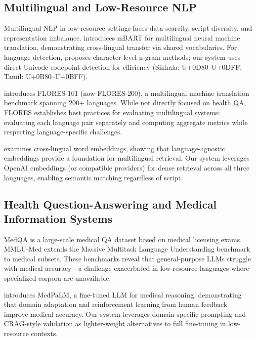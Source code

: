 \documentclass[11pt,a4paper]{article}
\begin{document}
\subsection{Multilingual and Low-Resource NLP}

Multilingual NLP in low-resource settings faces data scarcity, script diversity, and representation imbalance. \cite{lewis2019mbart} introduces mBART for multilingual neural machine translation, demonstrating cross-lingual transfer via shared vocabularies. For language detection, \cite{dunning1994statistical} proposes character-level n-gram methods; our system uses direct Unicode codepoint detection for efficiency (Sinhala: U+0D80--U+0DFF, Tamil: U+0B80--U+0BFF).

\cite{flores2021evaluation} introduces FLORES-101 (now FLORES-200), a multilingual machine translation benchmark spanning 200+ languages. While not directly focused on health QA, FLORES establishes best practices for evaluating multilingual systems: evaluating each language pair separately and computing aggregate metrics while respecting language-specific challenges.

\cite{artetxe2019cross} examines cross-lingual word embeddings, showing that language-agnostic embeddings provide a foundation for multilingual retrieval. Our system leverages OpenAI embeddings (or compatible providers) for dense retrieval across all three languages, enabling semantic matching regardless of script.

\subsection{Health Question-Answering and Medical Information Systems}

MedQA \cite{jin2021medqa} is a large-scale medical QA dataset based on medical licensing exams. MMLU-Med \cite{hendrycks2021measuring} extends the Massive Multitask Language Understanding benchmark to medical subsets. These benchmarks reveal that general-purpose LLMs struggle with medical accuracy—a challenge exacerbated in low-resource languages where specialized corpora are unavailable.

\cite{pal2022medpalm} introduces MedPaLM, a fine-tuned LLM for medical reasoning, demonstrating that domain adaptation and reinforcement learning from human feedback improve medical accuracy. Our system leverages domain-specific prompting and CRAG-style validation as lighter-weight alternatives to full fine-tuning in low-resource contexts.
\end{document}
